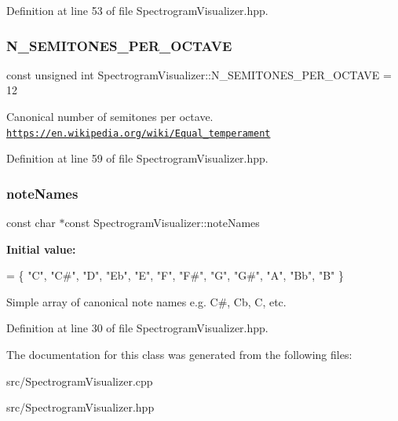 Definition at line 53 of file Spectrogram\+Visualizer.\+hpp.

\mbox{\label{structSpectrogramVisualizer_affbdeff0d7b800feb17aab0a367222da}} 
\subsubsection{\texorpdfstring{N\+\_\+\+S\+E\+M\+I\+T\+O\+N\+E\+S\+\_\+\+P\+E\+R\+\_\+\+O\+C\+T\+A\+VE}{N\_SEMITONES\_PER\_OCTAVE}}
{\footnotesize\ttfamily const unsigned int Spectrogram\+Visualizer\+::\+N\+\_\+\+S\+E\+M\+I\+T\+O\+N\+E\+S\+\_\+\+P\+E\+R\+\_\+\+O\+C\+T\+A\+VE = 12\hspace{0.3cm}{\ttfamily [static]}}

Canonical number of semitones per octave. \href{https://en.wikipedia.org/wiki/Equal_temperament}{\tt https\+://en.\+wikipedia.\+org/wiki/\+Equal\+\_\+temperament} 

Definition at line 59 of file Spectrogram\+Visualizer.\+hpp.

\mbox{\label{structSpectrogramVisualizer_ad833647df19d8ae0eb2e47efe989d1d9}} 
\subsubsection{\texorpdfstring{note\+Names}{noteNames}}
{\footnotesize\ttfamily const char $\ast$const Spectrogram\+Visualizer\+::note\+Names\hspace{0.3cm}{\ttfamily [static]}}

{\bfseries Initial value\+:}
\begin{DoxyCode}
= \{
    \textcolor{stringliteral}{"C"}, \textcolor{stringliteral}{"C#"}, \textcolor{stringliteral}{"D"}, \textcolor{stringliteral}{"Eb"}, \textcolor{stringliteral}{"E"}, \textcolor{stringliteral}{"F"}, \textcolor{stringliteral}{"F#"}, \textcolor{stringliteral}{"G"}, \textcolor{stringliteral}{"G#"}, \textcolor{stringliteral}{"A"}, \textcolor{stringliteral}{"Bb"}, \textcolor{stringliteral}{"B"}
\}
\end{DoxyCode}
Simple array of canonical note names e.\+g. C\#, Cb, C, etc. 

Definition at line 30 of file Spectrogram\+Visualizer.\+hpp.



The documentation for this class was generated from the following files\+:\begin{DoxyCompactItemize}
\item 
src/Spectrogram\+Visualizer.\+cpp\item 
src/Spectrogram\+Visualizer.\+hpp\end{DoxyCompactItemize}
